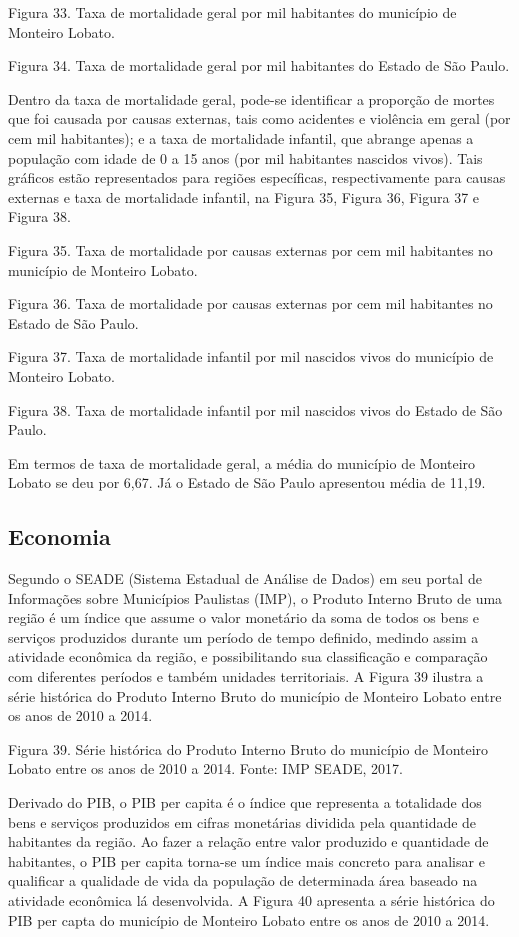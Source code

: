 Figura 33. Taxa de mortalidade geral por mil habitantes do município de Monteiro Lobato.

Figura 34. Taxa de mortalidade geral por mil habitantes do Estado de São Paulo.

Dentro da taxa de mortalidade geral, pode-se identificar a proporção de mortes que foi causada por causas externas, tais como acidentes e violência em geral (por cem mil habitantes); e a taxa de mortalidade infantil, que abrange apenas a população com idade de 0 a 15 anos (por mil habitantes nascidos vivos). Tais gráficos estão representados para regiões específicas, respectivamente para causas externas e taxa de mortalidade infantil, na Figura 35,  Figura 36, Figura 37 e Figura 38.

Figura 35. Taxa de mortalidade por causas externas por cem mil habitantes no município de Monteiro Lobato.

Figura 36. Taxa de mortalidade por causas externas por cem mil habitantes no Estado de São Paulo.
 
Figura 37. Taxa de mortalidade infantil por mil nascidos vivos do município de Monteiro Lobato.

Figura 38. Taxa de mortalidade infantil por mil nascidos vivos do Estado de São Paulo.

Em termos de taxa de mortalidade geral, a média do município de Monteiro Lobato se deu por 6,67. Já o Estado de São Paulo apresentou média de 11,19.

\subsection{Economia}

Segundo o SEADE (Sistema Estadual de Análise de Dados) em seu portal de Informações sobre Municípios Paulistas (IMP), o Produto Interno Bruto de uma região é um índice que assume o valor monetário da soma de todos os bens e serviços produzidos durante um período de tempo definido, medindo assim a atividade econômica da região, e possibilitando sua classificação e comparação com diferentes períodos e também unidades territoriais. A Figura 39 ilustra a série histórica do Produto Interno Bruto do município de Monteiro Lobato entre os anos de 2010 a 2014.
 
Figura 39. Série histórica do Produto Interno Bruto do município de Monteiro Lobato entre os anos de 2010 a 2014.
Fonte: IMP SEADE, 2017.

Derivado do PIB, o PIB per capita é o índice que representa a totalidade dos bens e serviços produzidos em cifras monetárias dividida pela quantidade de habitantes da região. Ao fazer a relação entre valor produzido e quantidade de habitantes, o PIB per capita torna-se um índice mais concreto para analisar e qualificar a qualidade de vida da população de determinada área baseado na atividade econômica lá desenvolvida. A Figura 40 apresenta a série histórica do PIB per capta do município de Monteiro Lobato entre os anos de 2010 a 2014.

